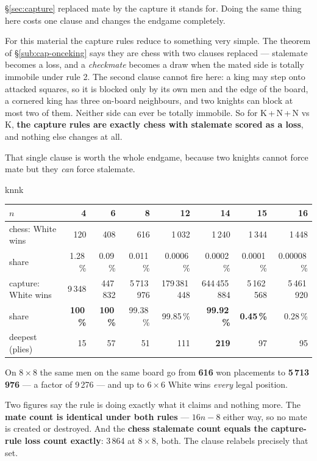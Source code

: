 \documentclass[11pt]{article}
\begin{document}
\S\ref{sec:capture} replaced mate by the capture it stands for. Doing the same thing here
costs one clause and changes the endgame completely.

For this material the capture rules reduce to something very simple. The
theorem of \S\ref{sub:cap-onceking} says they are chess with two clauses replaced --- stalemate
becomes a loss, and a \emph{checkmate} becomes a draw when the mated side is
totally immobile under rule 2. The second clause cannot fire here: a king may
step onto attacked squares, so it is blocked only by its own men and the edge
of the board, a cornered king has three on-board neighbours, and two knights can
block at most two of them. Neither side can ever be totally immobile. So for
K\,+\,N\,+\,N vs K, \textbf{the capture rules are exactly chess with stalemate
scored as a loss}, and nothing else changes at all.

That single clause is worth the whole endgame, because two knights cannot force
mate but they \emph{can} force stalemate.

\begin{result}[title={One clause, and a drawn endgame becomes a won one}]{knnk}
\begin{center}\small
\begin{tabular}{@{}lrrrrrrr@{}}
\toprule
$n$ & 4 & 6 & 8 & 12 & \textbf{14} & \textbf{15} & 16 \\
\midrule
chess: White wins        & 120 & 408 & 616 & 1\,032 & 1\,240 & 1\,344 & 1\,448 \\
\quad share              & 1.28\,\% & 0.09\,\% & 0.011\,\% & 0.0006\,\% & 0.0002\,\% & 0.0001\,\% & 0.00008\,\% \\
\addlinespace
capture: White wins      & 9\,348 & 447\,832 & 5\,713\,976 & 179\,381\,448 & 644\,455\,884 & 5\,162\,568 & 5\,461\,920 \\
\quad share              & \textbf{100\,\%} & \textbf{100\,\%} & 99.38\,\% & 99.85\,\% & \textbf{99.92\,\%} & \textbf{0.45\,\%} & 0.28\,\% \\
\quad deepest (plies)    & 15 & 57 & 51 & 111 & \textbf{219} & 97 & 95 \\
\bottomrule
\end{tabular}
\end{center}

\smallskip
On $8\times8$ the same men on the same board go from \textbf{616} won
placements to \textbf{5\,713\,976} --- a factor of 9\,276 --- and up to
$6\times6$ White wins \emph{every} legal position.

\smallskip
Two figures say the rule is doing exactly what it claims and nothing more. The
\textbf{mate count is identical under both rules} --- $16n-8$ either way, so no
mate is created or destroyed. And the \textbf{chess stalemate count equals the
capture-rule loss count exactly}: 3\,864 at $8\times8$, both. The clause
relabels precisely that set.
\end{result}
\end{document}
